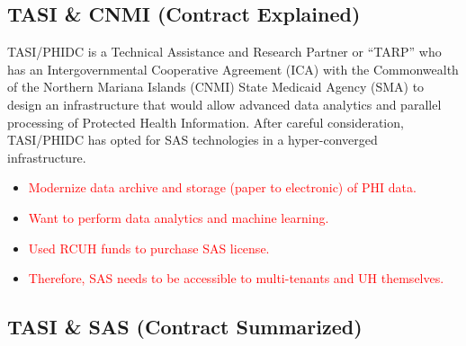 \subsection{TASI \& CNMI (Contract Explained)}
TASI/PHIDC is a Technical Assistance and Research Partner or “TARP” who has an Intergovernmental Cooperative Agreement (ICA) with the Commonwealth of the Northern Mariana Islands (CNMI) State Medicaid Agency (SMA) to design an infrastructure that would allow advanced data analytics and parallel processing of Protected Health Information. After careful consideration, TASI/PHIDC has opted for SAS technologies in a hyper-converged infrastructure.

\begin{itemize}
    \item \textcolor{red}{Modernize data archive and storage (paper to electronic) of PHI data.}
    \item \textcolor{red}{Want to perform data analytics and machine learning.}
    \item \textcolor{red}{Used RCUH funds to purchase SAS license.}
    \item \textcolor{red}{Therefore, SAS needs to be accessible to multi-tenants and UH themselves.}
\end{itemize}

\subsection{TASI \& SAS (Contract Summarized)}

